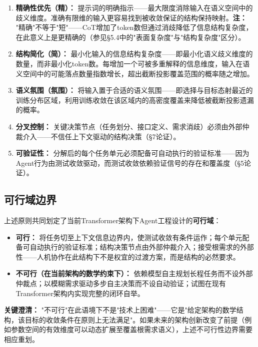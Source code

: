 \documentclass[11pt,a4paper]{ctexart}
\begin{document}
\begin{enumerate}[leftmargin=*,label=\textbf{P\arabic*}.]
    \item \textbf{精确性优先（精）：} 提示词的明确指示——最大限度消除输入在语义空间中的歧义维度。准确有限维的输入更容易找到被收敛保证的结构保持映射。\textbf{注：} "精确"不等于"短"——CoT增加了token数但通过消歧降低了信息结构复杂度，在此意义上是更精确的（参见§5.4中的"表面复杂度"与"结构复杂度"区分）。

    \item \textbf{结构简化（简）：} 最小化输入的信息结构复杂度——即最小化语义歧义维度的数量，而非最小化token数。每增加一个可被多重解释的信息维度，输入在语义空间中的可能落点数量指数增长，超出截断投影覆盖范围的概率随之增加。

    \item \textbf{语义氛围（氛围）：} 将输入置于合适的语义氛围——即选择与目标态射最近的训练分布区域，利用训练收敛在该区域内的高密度覆盖来降低被截断投影遗漏的概率。

    \item \textbf{分叉控制：} 关键决策节点（任务划分、接口定义、需求消歧）必须由外部仲裁介入——不信任上下文驱动的结构决策（§7论证）。

    \item \textbf{可验证性：} 分解后的每个任务单元必须配备可自动执行的验证标准——因为Agent行为由测试收敛驱动，而测试收敛依赖验证信号的存在和覆盖度（§5论证）。
\end{enumerate}

\subsection{可行域边界}

上述原则共同划定了当前Transformer架构下Agent工程设计的\textbf{可行域}：

\begin{itemize}[leftmargin=*]
    \item \textbf{可行：} 将任务切至上下文信息边界内，使测试收敛有条件运作；每个单元配备可自动执行的验证标准；结构决策节点由外部仲裁介入；接受根需求的外部性——人机协作在此结构下不是权宜的过渡方案，而是结构的必然要求。
    \item \textbf{不可行（在当前架构的数学约束下）：} 依赖模型自主规划长程任务而不设外部仲裁点；以模糊需求驱动多步自主决策而不设自动验证；试图在现有Transformer架构内实现完整的闭环自举。
\end{itemize}

\textbf{关键澄清：} "不可行"在此语境下不是"技术上困难"——它是"给定架构的数学结构，该目标的收敛条件在原则上无法满足"。如果未来的架构创新改变了前提（例如参数空间的有效维度可以动态扩展至覆盖根需求语义），上述不可行性边界需要相应重划。
\end{document}
